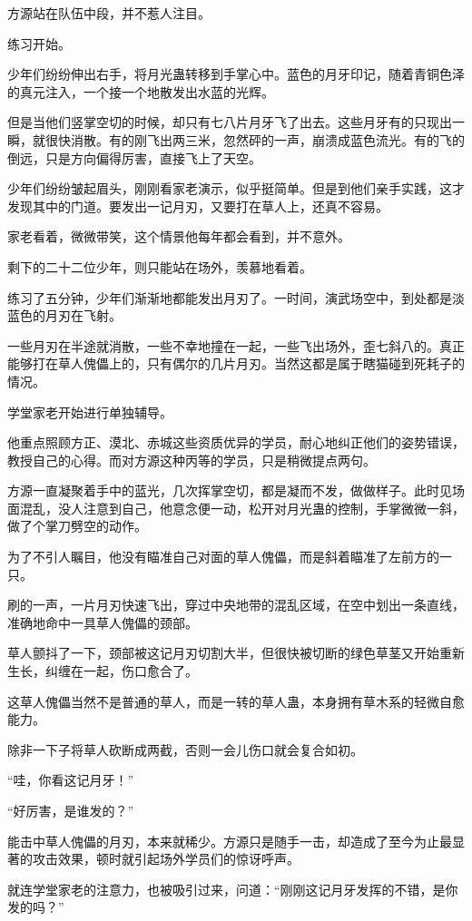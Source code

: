 \begin{this_body}
方源站在队伍中段，并不惹人注目。

练习开始。

少年们纷纷伸出右手，将月光蛊转移到手掌心中。蓝色的月牙印记，随着青铜色泽的真元注入，一个接一个地散发出水蓝的光辉。

但是当他们竖掌空切的时候，却只有七八片月牙飞了出去。这些月牙有的只现出一瞬，就很快消散。有的刚飞出两三米，忽然砰的一声，崩溃成蓝色流光。有的飞的倒远，只是方向偏得厉害，直接飞上了天空。

少年们纷纷皱起眉头，刚刚看家老演示，似乎挺简单。但是到他们亲手实践，这才发现其中的门道。要发出一记月刃，又要打在草人上，还真不容易。

家老看着，微微带笑，这个情景他每年都会看到，并不意外。

剩下的二十二位少年，则只能站在场外，羡慕地看着。

练习了五分钟，少年们渐渐地都能发出月刃了。一时间，演武场空中，到处都是淡蓝色的月刃在飞射。

一些月刃在半途就消散，一些不幸地撞在一起，一些飞出场外，歪七斜八的。真正能够打在草人傀儡上的，只有偶尔的几片月刃。当然这都是属于瞎猫碰到死耗子的情况。

学堂家老开始进行单独辅导。

他重点照顾方正、漠北、赤城这些资质优异的学员，耐心地纠正他们的姿势错误，教授自己的心得。而对方源这种丙等的学员，只是稍微提点两句。

方源一直凝聚着手中的蓝光，几次挥掌空切，都是凝而不发，做做样子。此时见场面混乱，没人注意到自己，他意念便一动，松开对月光蛊的控制，手掌微微一斜，做了个掌刀劈空的动作。

为了不引人瞩目，他没有瞄准自己对面的草人傀儡，而是斜着瞄准了左前方的一只。

刷的一声，一片月刃快速飞出，穿过中央地带的混乱区域，在空中划出一条直线，准确地命中一具草人傀儡的颈部。

草人颤抖了一下，颈部被这记月刃切割大半，但很快被切断的绿色草茎又开始重新生长，纠缠在一起，伤口愈合了。

这草人傀儡当然不是普通的草人，而是一转的草人蛊，本身拥有草木系的轻微自愈能力。

除非一下子将草人砍断成两截，否则一会儿伤口就会复合如初。

“哇，你看这记月牙！”

“好厉害，是谁发的？”

能击中草人傀儡的月刃，本来就稀少。方源只是随手一击，却造成了至今为止最显著的攻击效果，顿时就引起场外学员们的惊讶呼声。

就连学堂家老的注意力，也被吸引过来，问道：“刚刚这记月牙发挥的不错，是你发的吗？”


\end{this_body}
